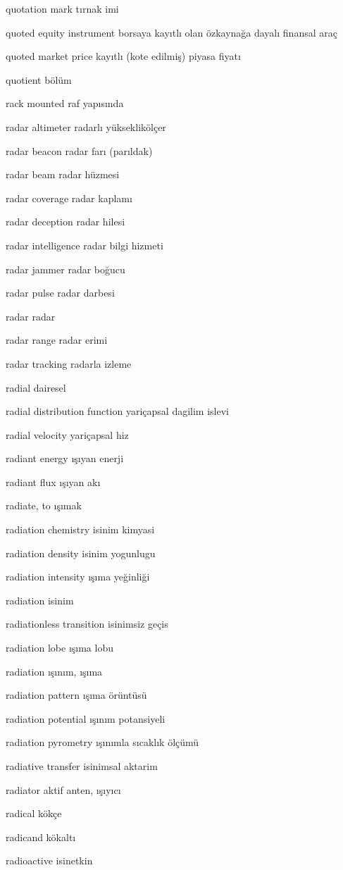 \documentclass[12pt,fleqn]{article}\usepackage{../../common}
\begin{document}
quotation mark tırnak imi

quoted equity instrument borsaya kayıtlı olan özkaynağa dayalı finansal araç

quoted market price kayıtlı (kote edilmiş) piyasa fiyatı

quotient bölüm

rack mounted raf yapısında

radar altimeter radarlı yükseklikölçer

radar beacon radar farı (parıldak)

radar beam radar hüzmesi

radar coverage radar kaplamı

radar deception radar hilesi

radar intelligence radar bilgi hizmeti

radar jammer radar boğucu

radar pulse radar darbesi

radar radar

radar range radar erimi

radar tracking radarla izleme

radial dairesel

radial distribution function yariçapsal dagilim islevi

radial velocity yariçapsal hiz

radiant energy ışıyan enerji

radiant flux ışıyan akı

radiate, to ışımak

radiation chemistry isinim kimyasi

radiation density isinim yogunlugu

radiation intensity ışıma yeğinliği

radiation isinim

radiationless transition isinimsiz geçis

radiation lobe ışıma lobu

radiation ışınım, ışıma

radiation pattern ışıma örüntüsü

radiation potential ışınım potansiyeli

radiation pyrometry ışınımla sıcaklık ölçümü

radiative transfer isinimsal aktarim

radiator aktif anten, ışıyıcı

radical kökçe

radicand kökaltı

radioactive isinetkin
\end{document}

